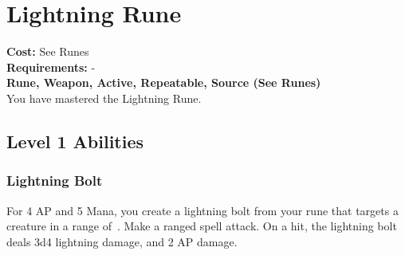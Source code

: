 \twocolumn
\section{Lightning Rune}\label{rune:lightning}
\textbf{Cost:} See Runes\\
\textbf{Requirements:} -\\
\textbf{Rune, Weapon, Active, Repeatable, Source (See Runes)}\\
You have mastered the Lightning Rune.

\subsection{Level 1 Abilities}

\subsubsection{Lightning Bolt}
For 4 AP and 5 Mana, you create a lightning bolt from your rune that targets a creature in a range of~.
Make a ranged spell attack.
On a hit, the lightning bolt deals 3d4 lightning damage, and 2 AP damage.